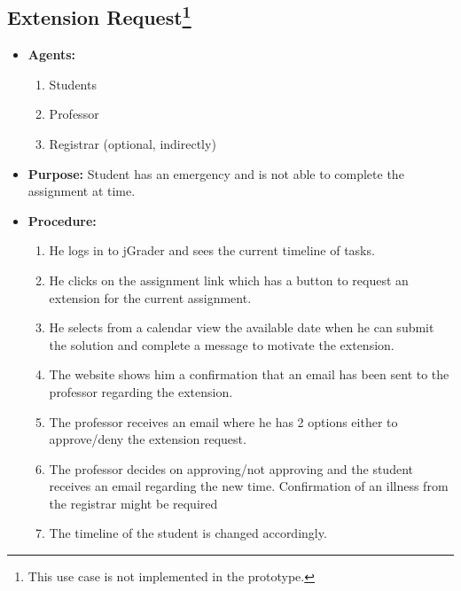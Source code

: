 \subsection{Extension Request\footnote{This use case is not implemented in the prototype. }}

\begin{itemize}
  \item \textbf{Agents:} \begin{enumerate}
    \item Students
    \item Professor
    \item Registrar (optional, indirectly)
  \end{enumerate}
  \item \textbf{Purpose:} Student has an emergency and is not able to complete the assignment at time.
  \item \textbf{Procedure:}
  \begin{enumerate}
    \item He logs in to jGrader and sees the current timeline of tasks.
    \item He clicks on the assignment link which has a button to request an extension for the current assignment.
    \item He selects from a calendar view the available date when he can submit the solution and complete a message to motivate the extension.
    \item The website shows him a confirmation that an email has been sent to the professor regarding the extension.
    \item The professor receives an email where he has 2 options either to approve/deny the extension request.
    \item The professor decides on approving/not approving and the student receives an email regarding the new time.
    	\subitem Confirmation of an illness from the registrar might be required
    \item The timeline of the student is changed accordingly.
  \end{enumerate}
\end{itemize}
